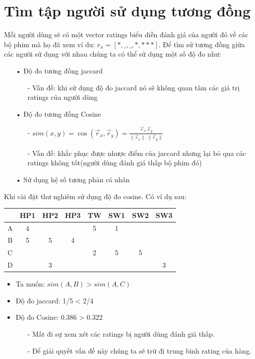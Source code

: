 \documentclass[a4paper,10pt]{report}
\begin{document}
\section{Tìm tập người sử dụng tương đồng}
Mỗi người dùng sẽ có một vector ratings biểu diễn đánh giá của người đó về các bộ phim mà họ đã xem ví du: $r_x = [*,\_,\_,*,***]$. Để tìm sử tương đồng giữa các người sử dụng với nhau chúng ta có thể sử dụng một số độ đo như:
\begin{itemize}
\item[•] Độ đo tương đồng jaccard
\begin{itemize}
\item[-] Vấn đề: khi sử dụng độ đo jaccard nó sẽ không quan tâm các giá trị ratings của người dùng
\end{itemize}
\item[•] Độ đo tương đồng Cosine
\begin{itemize}
\item[-] $sim(x,y) = \cos(\vec{r}_x , \vec{r}_y) = \frac{\vec{r}_x.\vec{r}_y}{\parallel \vec{r}_x \parallel . \parallel \vec{r}_y \parallel}$
\item[-] Vấn đề: khắc phục được nhược điểm của jaccard nhưng lại bỏ qua các ratings không tốt(người dùng đánh giá thấp bộ phim đó)
\end{itemize}
\item[•] Sử dụng hệ số tương phản cá nhân
\end{itemize}
Khi cài đặt thư nghiêm sử dụng độ đo cosine. Có ví dụ sau:
\begin{center}
\begin{longtable}{c|ccccccc}
 & HP1 & HP2 & HP3 & TW & SW1 & SW2 & SW3 \\
 \hline
A & 4 & & & 5 & 1 & \\
B & 5 & 5 & 4 &   &  \\
C &  &   &  & 2 & 5 & 5\\
D &  & 3 &  &  &  &  & 3 \\
\end{longtable}
\end{center}
\begin{itemize}
\item Ta muốn: $sim(A,B) > sim(A,C)$
\item Độ đo jaccard: 1/5 < 2/4
\item Độ đo Cosine: 0.386 > 0.322
\begin{itemize}
\item[-] Mất đi sự xem xét các ratings bị người dùng đánh giá thấp.
\item[-] Để giải quyết vấn đề này chúng ta sẽ trừ đi trung bình rating của hàng.
\end{itemize}
\end{itemize}
\end{document}
